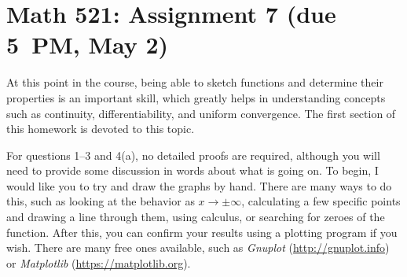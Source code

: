 \documentclass[12pt]{article}
\begin{document}
\section*{Math 521: Assignment 7 (due 5~PM, May 2)}
At this point in the course, being able to sketch functions and determine their
properties is an important skill, which greatly helps in understanding concepts
such as continuity, differentiability, and uniform convergence. The first
section of this homework is devoted to this topic.

For questions 1--3 and 4(a), no detailed proofs are required, although you will
need to provide some discussion in words about what is going on. To begin, I
would like you to try and draw the graphs by hand. There are many ways to do
this, such as looking at the behavior as $x\to \pm \infty$, calculating a few
specific points and drawing a line through them, using calculus, or searching
for zeroes of the function. After this, you can confirm your results using a
plotting program if you wish. There are many free ones available, such as
\textit{Gnuplot} (\url{http://gnuplot.info}) or \textit{Matplotlib}
(\url{https://matplotlib.org}).
\end{document}
